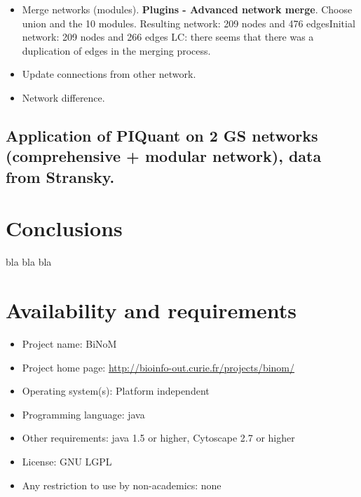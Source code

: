 \documentclass[10pt]{bmc_article}
\newenvironment{bmcformat}{\baselineskip20pt\sloppy\setboolean{publ}{false}}{\baselineskip20pt\sloppy}
\begin{document}
\begin{bmcformat}
\begin{enumerate}
\begin{itemize}
\item	Merge networks (modules). \textbf{Plugins - Advanced network merge}.
Choose union and the 10 modules. Resulting network: 209 nodes and 476
edgesInitial network: 209 nodes and 266 edges LC: there seems that there was a
duplication of edges in the merging process.
\item	Update connections from other network.
\item	Network difference.
\end{itemize}

\end{enumerate}

\subsection*{Application of PIQuant on 2 GS networks (comprehensive + modular network), data from Stransky.}


\section*{Conclusions}

bla bla bla

\section*{Availability and requirements}

\begin{itemize}
\item Project name: BiNoM
\item Project home page: \url{http://bioinfo-out.curie.fr/projects/binom/}
\item Operating system(s): Platform independent
\item Programming language: java
\item Other requirements: java 1.5 or higher, Cytoscape 2.7 or higher
\item License: GNU LGPL
\item Any restriction to use by non-academics: none
\end{itemize}






\end{bmcformat}
\end{document}
